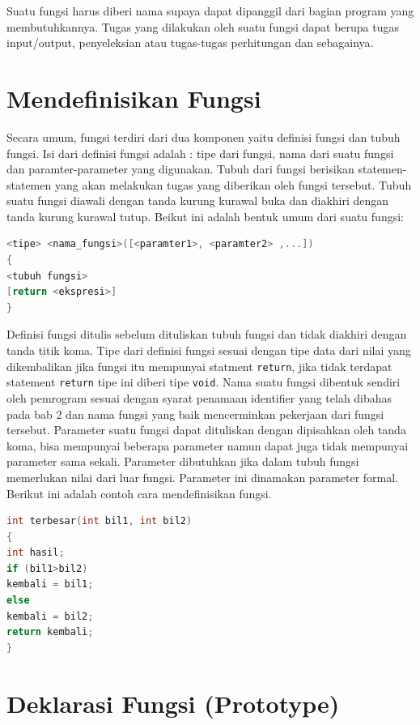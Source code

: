 Suatu fungsi harus diberi nama supaya dapat dipanggil dari bagian
program yang membutuhkannya. Tugas yang dilakukan oleh suatu fungsi
dapat berupa tugas input/output, penyeleksian atau tugas-tugas
perhitungan dan sebagainya.

\section{Mendefinisikan Fungsi}\label{mendefinisikan-fungsi}

Secara umum, fungsi terdiri dari dua komponen yaitu definisi fungsi dan
tubuh fungsi. Isi dari definisi fungsi adalah : tipe dari fungsi, nama
dari suatu fungsi dan paramter-parameter yang digunakan. Tubuh dari
fungsi berisikan statemen-statemen yang akan melakukan tugas yang
diberikan oleh fungsi tersebut. Tubuh suatu fungsi diawali dengan tanda
kurung kurawal buka dan diakhiri dengan tanda kurung kurawal tutup.
Beikut ini adalah bentuk umum dari suatu fungsi:

\begin{lstlisting}[language=c++, numbers=none]
<tipe> <nama_fungsi>([<paramter1>, <paramter2> ,...])
{
<tubuh fungsi>
[return <ekspresi>]
}
\end{lstlisting}

Definisi fungsi ditulis sebelum dituliskan tubuh fungsi dan tidak
diakhiri dengan tanda titik koma. Tipe dari definisi fungsi sesuai
dengan tipe data dari nilai yang dikembalikan jika fungsi itu mempunyai
statment \texttt{return}, jika tidak terdapat statement \texttt{return}
tipe ini diberi tipe \texttt{void}. Nama suatu fungsi dibentuk sendiri
oleh pemrogram sesuai dengan syarat penamaan identifier yang telah
dibahas pada bab 2 dan nama fungsi yang baik mencerminkan pekerjaan dari
fungsi tersebut. Parameter suatu fungsi dapat dituliskan dengan
dipisahkan oleh tanda koma, bisa mempunyai beberapa parameter namun
dapat juga tidak mempunyai parameter sama sekali. Parameter dibutuhkan
jika dalam tubuh fungsi memerlukan nilai dari luar fungsi. Parameter ini
dinamakan parameter formal. Berikut ini adalah contoh cara
mendefinisikan fungsi.

\begin{lstlisting}[language=c++, numbers=none]
int terbesar(int bil1, int bil2)
{
int hasil;
if (bil1>bil2)
kembali = bil1;
else
kembali = bil2;
return kembali;
}
\end{lstlisting}

\section{Deklarasi Fungsi (Prototype)}\label{deklarasi-fungsi-prototype}

